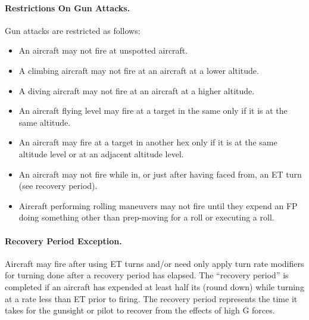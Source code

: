 \paragraph{Restrictions On Gun Attacks.} Gun attacks are restricted as follows:

\begin{itemize}
    \item An aircraft may not fire at unspotted aircraft.
    \item A climbing aircraft may not fire at an aircraft at a lower altitude.
    \item A diving aircraft may not fire at an aircraft at a higher altitude.
    \item An aircraft flying level may fire at a target in the same  only if it is at the same altitude.
    \item An aircraft may fire at a target in another hex only if it is at the same altitude level or at an adjacent altitude level.
    \item An aircraft may not fire while in, or just after having faced from, an ET turn (see recovery period).
    \item Aircraft performing rolling maneuvers may not fire until they expend an FP doing something other than prep-moving for a roll or executing a roll.
\end{itemize}


\paragraph{Recovery Period Exception.} Aircraft may fire after using ET turns and/or need only apply turn rate modifiers for turning done after a recovery period has elapsed. The “recovery period” is completed if an aircraft has expended at least half its  (round down) while turning at a rate less than ET  prior to firing. The recovery period represents the time it takes for the gunsight or pilot to recover from the effects of high G forces.

